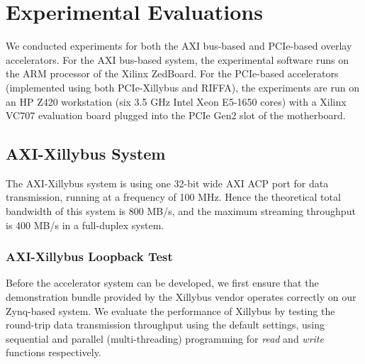 \section{Experimental Evaluations}
We conducted experiments for both the AXI bus-based and PCIe-based overlay accelerators.  
For the AXI bus-based system, the experimental software runs on the ARM processor of the Xilinx ZedBoard. 
For the PCIe-based accelerators (implemented using both PCIe-Xillybus and RIFFA), the experiments are run on an HP Z420 workstation (six 3.5 GHz Intel Xeon E5-1650 cores) with a Xilinx VC707 evaluation board plugged into the PCIe Gen2 slot of the motherboard. 

\subsection{AXI-Xillybus System}
The AXI-Xillybus system is using one 32-bit wide AXI ACP port for data transmission, running at a frequency of 100 MHz. 
Hence the theoretical total bandwidth of this system is 800 MB/s, and the maximum streaming throughput is 400 MB/s in a full-duplex system. 

\subsubsection{AXI-Xillybus Loopback Test}
Before the accelerator system can be developed, we first ensure that the demonstration bundle provided by the Xillybus vendor operates correctly on our Zynq-based system. 
We evaluate the performance of Xillybus by testing the round-trip data transmission throughput using the default settings, using sequential and parallel (multi-threading) programming for \textit{read} and \textit{write} functions respectively. 

